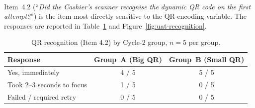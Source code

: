 \paragraph{}Item~4.2 (``\textit{Did the Cashier's scanner recognise the dynamic QR code on the first attempt?}'') is the item most directly sensitive to the QR-encoding variable. The responses are reported in Table~\ref{tab:qr-recognition} and Figure~\ref{fig:uat-recognition}.

\begin{table}[H]
  \centering
  \caption{QR recognition (Item 4.2) by Cycle-2 group, $n = 5$ per group.}
  \label{tab:qr-recognition}
  \begin{tabular}{|l|c|c|}
    \hline
    Response & Group~A (Big QR) & Group~B (Small QR) \\\hline
    Yes, immediately & 4 / 5 & 5 / 5 \\\hline
    Took 2--3 seconds to focus & 1 / 5 & 0 / 5 \\\hline
    Failed / required retry & 0 / 5 & 0 / 5 \\\hline
  \end{tabular}
\end{table}

